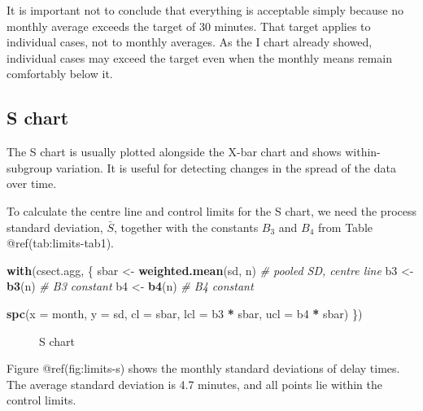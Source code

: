 \documentclass[
]{book}
\makeatletter
\newenvironment{Shaded}{\begin{snugshade}}{\end{snugshade}}
\newcommand{\AttributeTok}[1]{\textcolor[rgb]{0.13,0.29,0.53}{#1}}
\newcommand{\CommentTok}[1]{\textcolor[rgb]{0.56,0.35,0.01}{\textit{#1}}}
\newcommand{\FunctionTok}[1]{\textcolor[rgb]{0.13,0.29,0.53}{\textbf{#1}}}
\newcommand{\NormalTok}[1]{#1}
\newcommand{\OtherTok}[1]{\textcolor[rgb]{0.56,0.35,0.01}{#1}}
\newcommand{\SpecialCharTok}[1]{\textcolor[rgb]{0.81,0.36,0.00}{\textbf{#1}}}
\newcommand*\pandocbounded[1]{%
  \sbox\pandoc@box{#1}%
  \Gscale@div\@tempa{\textheight}{\dimexpr\ht\pandoc@box+\dp\pandoc@box\relax}%
  \Gscale@div\@tempb{\linewidth}{\wd\pandoc@box}%
  \ifdim\@tempb\p@<\@tempa\p@\let\@tempa\@tempb\fi%
  \ifdim\@tempa\p@<\p@\scalebox{\@tempa}{\usebox\pandoc@box}%
  \else\usebox{\pandoc@box}%
  \fi%
}
\makeatother
\begin{document}
It is important not to conclude that everything is acceptable simply
because no monthly average exceeds the target of 30 minutes. That target
applies to individual cases, not to monthly averages. As the I chart
already showed, individual cases may exceed the target even when the
monthly means remain comfortably below it.

\subsection{S chart}\label{s-chart}

The S chart is usually plotted alongside the X-bar chart and shows
within-subgroup variation. It is useful for detecting changes in the
spread of the data over time.

To calculate the centre line and control limits for the S chart, we need
the process standard deviation, \(\bar{S}\), together with the constants
\(B_3\) and \(B_4\) from Table @ref(tab:limits-tab1).

\begin{Shaded}
\begin{Highlighting}[]
\FunctionTok{with}\NormalTok{(csect.agg, \{}
\NormalTok{  sbar    }\OtherTok{\textless{}{-}} \FunctionTok{weighted.mean}\NormalTok{(sd, n)  }\CommentTok{\# pooled SD, centre line}
\NormalTok{  b3      }\OtherTok{\textless{}{-}} \FunctionTok{b3}\NormalTok{(n)                 }\CommentTok{\# B3 constant}
\NormalTok{  b4      }\OtherTok{\textless{}{-}} \FunctionTok{b4}\NormalTok{(n)                 }\CommentTok{\# B4 constant}
  
  \FunctionTok{spc}\NormalTok{(}\AttributeTok{x   =}\NormalTok{ month,}
      \AttributeTok{y   =}\NormalTok{ sd,}
      \AttributeTok{cl  =}\NormalTok{ sbar,}
      \AttributeTok{lcl =}\NormalTok{ b3 }\SpecialCharTok{*}\NormalTok{ sbar,}
      \AttributeTok{ucl =}\NormalTok{ b4 }\SpecialCharTok{*}\NormalTok{ sbar)}
\NormalTok{\})}
\end{Highlighting}
\end{Shaded}

\begin{figure}
\centering
\pandocbounded{}
\caption{S chart}
\end{figure}

Figure @ref(fig:limits-s) shows the monthly standard deviations of delay
times. The average standard deviation is 4.7 minutes, and all points lie
within the control limits.
\end{document}
